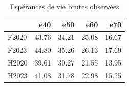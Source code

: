 \begin{table}[htbp]
\caption{Espérances de vie brutes observées}
\label{tab:esperances_brutes}
\begin{tabular}{lrrrr}
\toprule
 & e40 & e50 & e60 & e70 \\
\midrule
F2020 & 43.76 & 34.21 & 25.08 & 16.67 \\
F2023 & 44.80 & 35.26 & 26.13 & 17.69 \\
H2020 & 39.61 & 30.27 & 21.55 & 13.95 \\
H2023 & 41.08 & 31.78 & 22.98 & 15.25 \\
\bottomrule
\end{tabular}
\end{table}
